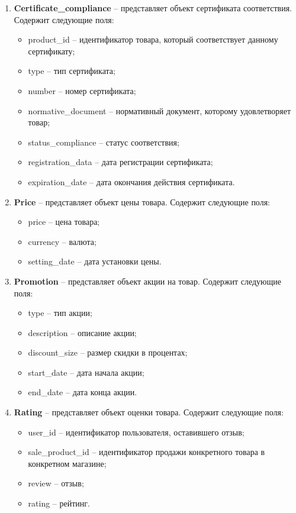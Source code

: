\begin{enumerate}
	\item \textbf{Certificate\_compliance} -- представляет объект сертификата соответствия. Содержит следующие поля: 
	\begin{itemize}
		\item product\_id -- идентификатор товара, который соответствует данному сертификату;
		\item type -- тип сертификата;
		\item number -- номер сертификата;
		\item normative\_document -- нормативный документ, которому удовлетворяет товар;
		\item status\_compliance -- статус соответствия;
		\item registration\_data -- дата регистрации сертификата;
		\item expiration\_date -- дата окончания действия сертификата.
	\end{itemize}
	
	\item \textbf{Price} -- представляет объект цены товара. Содержит следующие поля: 
	\begin{itemize}
		\item price -- цена товара;
		\item currency -- валюта;
		\item setting\_date -- дата установки цены.
	\end{itemize}
	
	\item \textbf{Promotion} -- представляет объект акции на товар. Содержит следующие поля: 
	\begin{itemize}
		\item type -- тип акции;
		\item description -- описание акции;
		\item discount\_size -- размер скидки в процентах;
		\item start\_date -- дата начала акции;
		\item end\_date -- дата конца акции.
	\end{itemize}
	
	\item \textbf{Rating} -- представляет объект оценки товара. Содержит следующие поля: 
	\begin{itemize}
		\item user\_id -- идентификатор пользователя, оставившего отзыв;
		\item  sale\_product\_id -- идентификатор продажи конкретного товара в конкретном магазине;
		\item review -- отзыв;
		\item rating -- рейтинг.
	\end{itemize}
	

\end{enumerate}
